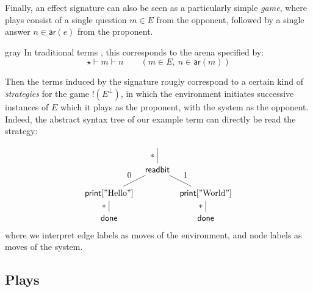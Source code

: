 \documentclass[format=sigplan,authordraft]{acmart}
\newcommand{\kw}[1]{\ensuremath{ \mathsf{#1} }}
\begin{document}
Finally,
an effect signature can also be seen as
a particularly simple \emph{game},
where plays consist of a single question $m \in E$ from the opponent,
followed by a single answer $n \in \kw{ar}(e)$ from the proponent.
\begin{color}{gray}
In traditional terms \cite{gamesem99},
this corresponds to the arena specified by:
\[
    \star \vdash m \vdash n \qquad
      (m \in E, \: n \in \kw{ar}(m))
\]
\end{color}
Then the terms induced by the signature
rougly correspond to a certain kind of \emph{strategies}
for the game $!(E^\bot)$,
in which the environment initiates successive
instances of $E$ which it plays as the proponent,
with the system as the opponent.
Indeed, the abstract syntax tree of our example term
can directly be read the strategy:
\[
  \begin{tikzpicture}
    \node (W) at (0,0) {};
    \node (R) at (0,-1) {$\kw{readbit}$};
    \node (W0) at (-2,-2) {$\kw{print}["\text{Hello}"]$};
    \node (W1) at (+2,-2) {$\kw{print}["\text{World}"]$};
    \node (K0) at (-2,-3) {$\kw{done}$};
    \node (K1) at (+2,-3) {$\kw{done}$};
    \path (W) edge node[auto,swap] {$*$} (R);
    \path (R) edge node[auto,swap] {0} (W0);
    \path (R) edge node[auto] {1} (W1);
    \path (W0) edge node[auto,swap] {$*$} (K0);
    \path (W1) edge node[auto,swap] {$*$} (K1);
  \end{tikzpicture}
\]
where we interpret edge labels
as moves of the environment,
and node labels as moves of the system.



\subsection{Plays} \label{sec:intm:plays} %
\end{document}
